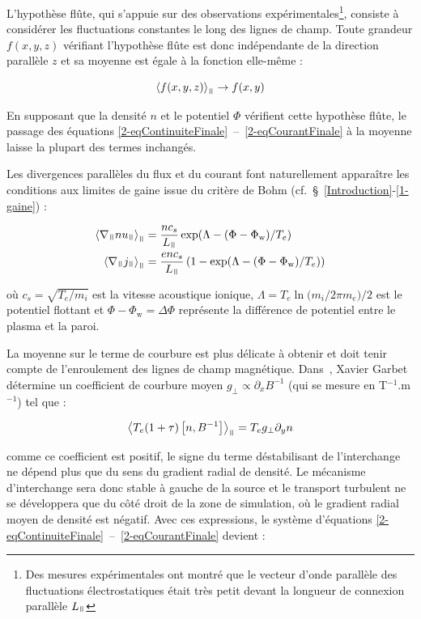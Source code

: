 \begin{refsection}
 L'hypothèse flûte, qui s'appuie sur des observations
expérimentales\footnote{Des mesures expérimentales ont montré que le vecteur
d'onde parallèle des fluctuations électrostatiques était très petit devant la
longueur de connexion parallèle $L_\para$\parencite{Wootton}}, consiste à
considérer les fluctuations constantes le long des lignes de champ. Toute
grandeur $f(x,y,z)$ vérifiant l'hypothèse flûte est donc indépendante de la
direction parallèle $z$ et sa moyenne est égale à la fonction elle-même :

\begin{equation}
\left<f(x,y,z)\right>_\para\rightarrow f(x,y)
\end{equation}

En supposant que la densité $n$ et le potentiel $\Phi$ vérifient cette hypothèse
flûte, le passage des équations
\eqref{2-eqContinuiteFinale}~--~\eqref{2-eqCourantFinale} à la moyenne laisse la plupart des termes inchangés.

Les divergences parallèles du flux et du
courant font naturellement apparaître
les conditions aux limites de gaine issue du critère de Bohm
(cf.~\S~\ref{Introduction}-\ref{1-gaine}) :

\begin{align}
\left<\nabla_\para
nu_\para\right>_\para&=\frac{nc_s}{L_\para}\exp(\Lambda-(\Phi-\Phi_\text{w})/T_e)
\\
\left<\nabla_\para
j_\para\right>_\para&=\frac{enc_s}{L_\para}\left(1-\exp(\Lambda-(\Phi-\Phi_\text{w})/T_e)\right)
\end{align}

où $c_s=\sqrt{T_e/m_i}$ est la vitesse acoustique
ionique, $\Lambda=T_{e}\ln({m_{i}/2\pi m_{e})/2}$ est le
potentiel flottant et $\Phi-\Phi_\text{w}=\Delta \Phi$ représente la
différence de potentiel entre le plasma et la paroi. 

La moyenne sur le terme de courbure est plus délicate à obtenir et doit tenir
compte de l'enroulement des lignes de champ magnétique.
Dans~\parencite{Garbet}, Xavier Garbet détermine un coefficient de courbure
moyen $g_\perp\propto\partial_xB^{-1}$ (qui se mesure en T$^{-1}$.m$^{-1}$) tel
que :

\begin{equation}
\left<T_e(1+\tau)\left[n,B^{-1}\right]\right>_\para=T_eg_\perp\partial_yn
\end{equation}

comme ce coefficient est positif, le signe du terme déstabilisant
de l'interchange ne dépend plus que du sens du gradient
radial de densité. Le mécanisme d'interchange sera donc stable à gauche de la
source et le transport turbulent ne se développera que du côté droit de la zone
de simulation, où le gradient radial moyen de densité est négatif.
Avec ces expressions, le système d'équations \eqref{2-eqContinuiteFinale}~--~\eqref{2-eqCourantFinale} devient :


\end{refsection}
